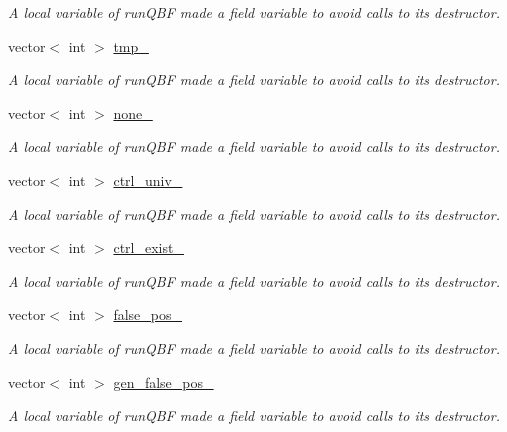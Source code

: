 \begin{DoxyCompactItemize}
\begin{DoxyCompactList}\small\item\em A local variable of run\-Q\-B\-F made a field variable to avoid calls to its destructor. \end{DoxyCompactList}\item 
vector$<$ int $>$ \hyperlink{classParExtractorQBFWorker_ad3df44a54420426b8408c3c72b73f64b}{tmp\-\_\-}
\begin{DoxyCompactList}\small\item\em A local variable of run\-Q\-B\-F made a field variable to avoid calls to its destructor. \end{DoxyCompactList}\item 
vector$<$ int $>$ \hyperlink{classParExtractorQBFWorker_a2c3b13b8d789c4e25aebd2a7d714cbdb}{none\-\_\-}
\begin{DoxyCompactList}\small\item\em A local variable of run\-Q\-B\-F made a field variable to avoid calls to its destructor. \end{DoxyCompactList}\item 
vector$<$ int $>$ \hyperlink{classParExtractorQBFWorker_a5e826e8f53247390d079c650363ed6d3}{ctrl\-\_\-univ\-\_\-}
\begin{DoxyCompactList}\small\item\em A local variable of run\-Q\-B\-F made a field variable to avoid calls to its destructor. \end{DoxyCompactList}\item 
vector$<$ int $>$ \hyperlink{classParExtractorQBFWorker_a8e31207c1f8933052cb84f85bd558e4c}{ctrl\-\_\-exist\-\_\-}
\begin{DoxyCompactList}\small\item\em A local variable of run\-Q\-B\-F made a field variable to avoid calls to its destructor. \end{DoxyCompactList}\item 
vector$<$ int $>$ \hyperlink{classParExtractorQBFWorker_a447ecd3d7dcc60fa2ccfa738443d1f08}{false\-\_\-pos\-\_\-}
\begin{DoxyCompactList}\small\item\em A local variable of run\-Q\-B\-F made a field variable to avoid calls to its destructor. \end{DoxyCompactList}\item 
vector$<$ int $>$ \hyperlink{classParExtractorQBFWorker_a324449464ae04fc7bef80cdd1ed9640f}{gen\-\_\-false\-\_\-pos\-\_\-}
\begin{DoxyCompactList}\small\item\em A local variable of run\-Q\-B\-F made a field variable to avoid calls to its destructor. \end{DoxyCompactList}\item 

\end{DoxyCompactItemize}
